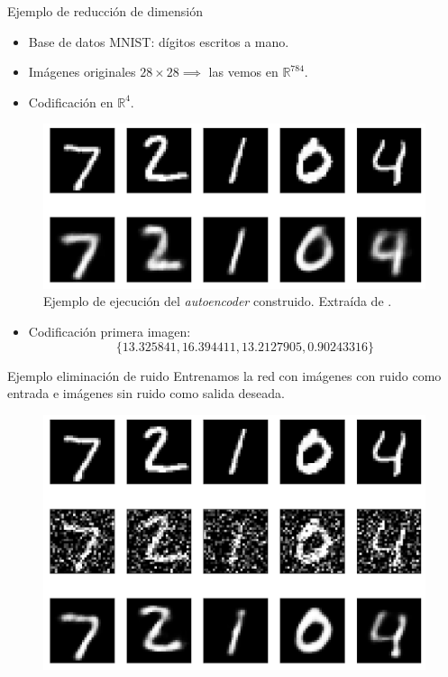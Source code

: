 \documentclass[spanish]{beamer}
\begin{document}
\begin{frame}{Ejemplo de reducción de dimensión}
  \begin{itemize}
    \item Base de datos MNIST: dígitos escritos a mano.
    \item Imágenes originales $28\times28 \implies$ las vemos en $\mathbb{R}^{784}$.
    \item Codificación en $\mathbb{R}^4$.
  \end{itemize}
\vspace{1em}
\begin{figure}[h]
  \centering
  \includegraphics[width=.55\textwidth]{img/autoencoder_ex1}
  \caption{Ejemplo de ejecución del \textit{autoencoder} construido. Extraída de \parencite{arden_autoencoder_2017}.}
  \label{fig:autoencoder_ex1}
\end{figure}
\vspace{-1em}
\begin{itemize}
\item Codificación primera imagen: $$\{13.325841, 16.394411, 13.2127905, 0.90243316\}$$
\end{itemize}

\end{frame}

\begin{frame}{Ejemplo eliminación de ruido}
Entrenamos la red con imágenes con ruido como entrada e imágenes sin ruido como
salida deseada.
\begin{figure}[h]
  \includegraphics[width=.6\textwidth]{img/autoencoder_ex2}
\end{figure}
\end{frame}
\end{document}
